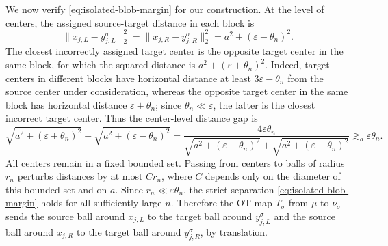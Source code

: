 \documentclass[11pt,twoside]{article}
\begin{document}
We now verify \eqref{eq:isolated-blob-margin} for our
construction. At the level of centers, the assigned source-target
distance in each block is
\[
\|x_{j,L}-y_{j,L}^{\sigma}\|_2^2
=
\|x_{j,R}-y_{j,R}^{\sigma}\|_2^2
=
a^2+(\varepsilon-\theta_n)^2.
\]
The closest incorrectly assigned target center is the opposite target
center in the same block, for which the squared distance is $a^2+(\varepsilon+\theta_n)^2.$ 
Indeed, target centers in different blocks have horizontal distance at least $3\varepsilon-\theta_n$ from the source center under consideration, whereas the opposite target center in the same block has horizontal distance $\varepsilon+\theta_n$; since $\theta_n\ll \varepsilon$, the latter is the closest incorrect target center.
Thus the center-level distance gap is
\[
\sqrt{a^2+(\varepsilon+\theta_n)^2}
-
\sqrt{a^2+(\varepsilon-\theta_n)^2}
=
\frac{4\varepsilon\theta_n}{\sqrt{a^2+(\varepsilon+\theta_n)^2} + \sqrt{a^2+(\varepsilon-\theta_n)^2}} \gtrsim_a \varepsilon \theta_n.
\]
All centers remain in a fixed bounded set. Passing from centers to balls
of radius $r_n$ perturbs distances by at most $C r_n$, where
$C$ depends only on the diameter of this bounded set and on $a$. Since
$r_n\ll \varepsilon\theta_n$, the strict separation
\eqref{eq:isolated-blob-margin} holds for all sufficiently large $n$.
Therefore the OT map $T_\sigma$ from $\mu$ to $\nu_\sigma$ sends
the source ball around $x_{j,L}$ to the target ball around
$y_{j,L}^{\sigma}$ and the source ball around $x_{j,R}$ to the target
ball around $y_{j,R}^{\sigma}$, by translation.
\end{document}
